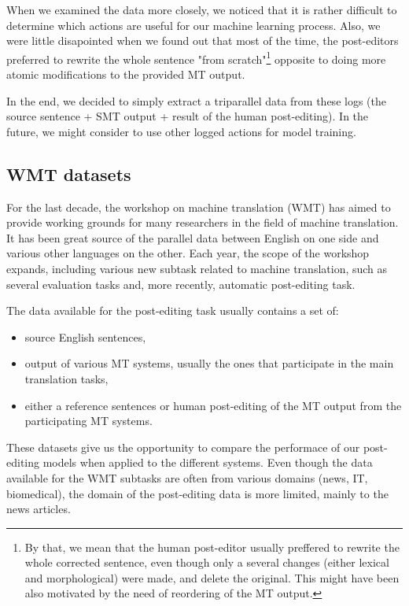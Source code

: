 When we examined the data more closely,
we noticed that it is rather difficult to determine which actions are
useful for our machine learning process. Also, we were little disapointed
when we found out that most of the time, the post-editors preferred to
rewrite the whole sentence "from scratch"\footnote{By that, we mean that the
human post-editor usually preffered to rewrite the whole corrected sentence, even though
only a several changes (either lexical and morphological) were made, and delete the original.
This might have been also motivated by the need of reordering of the MT output.}
opposite to doing more atomic modifications to the provided MT output.

In the end, we decided to simply extract a triparallel data from these logs (the source
sentence + SMT output + result of the human post-editing). In the future,
we might consider to use other logged actions for model training.

\subsection{WMT datasets}

For the last decade, the workshop on machine translation (WMT) has aimed
to provide working grounds for many researchers in the field of machine
translation. It has been great source of the parallel data between English
on one side and various other languages on the other. Each year, the scope
of the workshop expands, including various new subtask related to machine translation,
such as several evaluation tasks and, more recently, automatic post-editing task.

The data available for the post-editing task usually contains a set of:
\begin{itemize}
    \item source English sentences,
    \item output of various MT systems, usually the ones that participate in the main
translation tasks,
    \item either a reference sentences or human post-editing of the MT output from the participating MT systems.
\end{itemize}

These datasets give us the opportunity to compare the performace of our post-editing
models when applied to the different systems. Even though the data available for the
WMT subtasks are often from various domains (news, IT, biomedical), the domain of the post-editing
data is more limited, mainly to the news articles.

